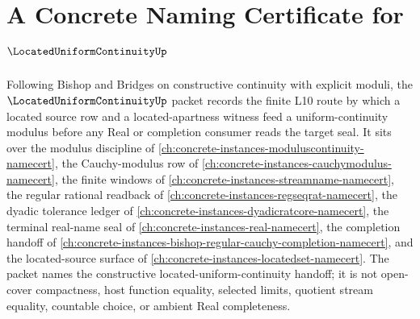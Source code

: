 \chapter{A Concrete Naming Certificate for $\LocatedUniformContinuityUp$}
\label{ch:concrete-instances-located-uniform-continuity-namecert}

Following Bishop and Bridges on constructive continuity with explicit moduli, the $\LocatedUniformContinuityUp$ packet records the finite L10 route by which a located source row and a located-apartness witness feed a uniform-continuity modulus before any Real or completion consumer reads the target seal. It sits over the modulus discipline of \autoref{ch:concrete-instances-moduluscontinuity-namecert}, the Cauchy-modulus row of \autoref{ch:concrete-instances-cauchymodulus-namecert}, the finite windows of \autoref{ch:concrete-instances-streamname-namecert}, the regular rational readback of \autoref{ch:concrete-instances-regseqrat-namecert}, the dyadic tolerance ledger of \autoref{ch:concrete-instances-dyadicratcore-namecert}, the terminal real-name seal of \autoref{ch:concrete-instances-real-namecert}, the completion handoff of \autoref{ch:concrete-instances-bishop-regular-cauchy-completion-namecert}, and the located-source surface of \autoref{ch:concrete-instances-locatedset-namecert}. The packet names the constructive located-uniform-continuity handoff; it is not open-cover compactness, host function equality, selected limits, quotient stream equality, countable choice, or ambient Real completeness.

